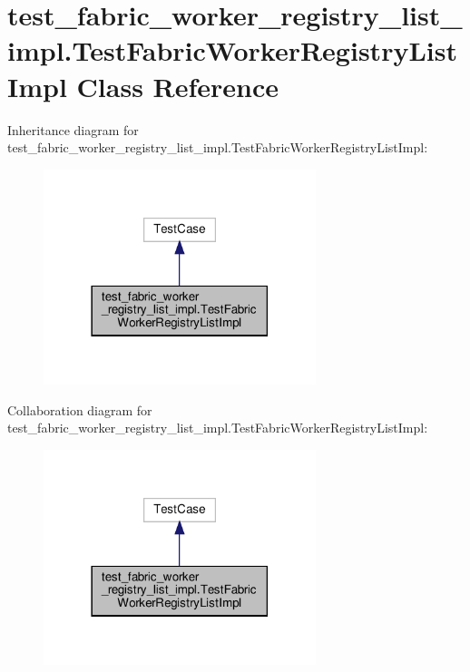 \hypertarget{classtest__fabric__worker__registry__list__impl_1_1TestFabricWorkerRegistryListImpl}{}\section{test\+\_\+fabric\+\_\+worker\+\_\+registry\+\_\+list\+\_\+impl.\+Test\+Fabric\+Worker\+Registry\+List\+Impl Class Reference}
\label{classtest__fabric__worker__registry__list__impl_1_1TestFabricWorkerRegistryListImpl}


Inheritance diagram for test\+\_\+fabric\+\_\+worker\+\_\+registry\+\_\+list\+\_\+impl.\+Test\+Fabric\+Worker\+Registry\+List\+Impl\+:
\nopagebreak
\begin{figure}[H]
\begin{center}
\leavevmode
\includegraphics[width=225pt]{classtest__fabric__worker__registry__list__impl_1_1TestFabricWorkerRegistryListImpl__inherit__graph}
\end{center}
\end{figure}


Collaboration diagram for test\+\_\+fabric\+\_\+worker\+\_\+registry\+\_\+list\+\_\+impl.\+Test\+Fabric\+Worker\+Registry\+List\+Impl\+:
\nopagebreak
\begin{figure}[H]
\begin{center}
\leavevmode
\includegraphics[width=225pt]{classtest__fabric__worker__registry__list__impl_1_1TestFabricWorkerRegistryListImpl__coll__graph}
\end{center}
\end{figure}
